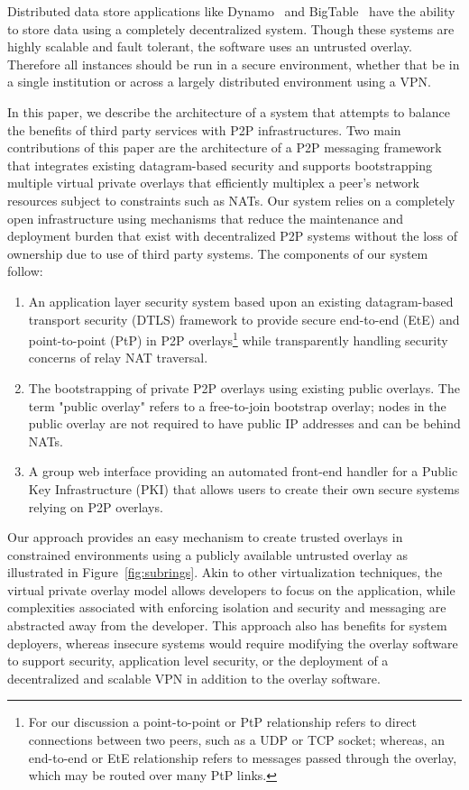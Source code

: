 \documentclass[conference]{IEEEtran}
\begin{document}
Distributed data store applications like Dynamo~\cite{dynamo} and
BigTable~\cite{bigtable} have the ability to store data using a completely
decentralized system.  Though these systems are highly scalable and fault
tolerant, the software uses an untrusted overlay.  Therefore all instances
should be run in a secure environment, whether that be in a single institution
or across a largely distributed environment using a VPN.

In this paper, we describe the architecture of a system that attempts
to balance the benefits of third party services with P2P infrastructures.
Two main contributions of this paper are the architecture of a P2P messaging
framework that integrates existing datagram-based security and supports
bootstrapping multiple virtual private overlays that efficiently multiplex a
peer's network resources subject to constraints such as NATs.
Our system relies on a completely open infrastructure using mechanisms that
reduce the maintenance and deployment burden that exist with decentralized
P2P systems without the loss of ownership due to use of third party systems.
The components of our system follow:
\begin{enumerate}
\setlength{\itemsep}{0pt}
\setlength{\parskip}{0pt}
\item An application layer security system based upon an existing datagram-based
transport security (DTLS) framework to provide secure end-to-end (EtE) and
point-to-point (PtP) in P2P overlays\footnote{For our discussion a point-to-point
or PtP relationship refers to direct connections between two peers, such as a UDP
or TCP socket; whereas, an end-to-end or EtE relationship refers to messages passed
through the overlay, which may be routed over many PtP links.}
 while transparently handling security
concerns of relay NAT traversal.
\item The bootstrapping of private P2P overlays using existing public overlays.
The term "public overlay" refers to a free-to-join bootstrap overlay; nodes in
the public overlay are not required to have public IP addresses and can be
behind NATs.
\item A group web interface providing an automated front-end handler for a 
Public Key Infrastructure (PKI) that allows users to create their own secure
systems relying on P2P overlays.
\end{enumerate}

Our approach provides an easy mechanism to create trusted overlays in
constrained environments using a publicly available untrusted overlay as
illustrated in Figure~\ref{fig:subrings}.  Akin to other virtualization
techniques, the virtual private overlay model allows developers to focus
on the application, while complexities associated with enforcing isolation
and security and messaging are abstracted away from the developer.
This approach also has benefits for system deployers, whereas insecure systems
would require modifying the overlay software to support security, application
level security, or the deployment of a decentralized and scalable VPN in
addition to the overlay software.
\end{document}
